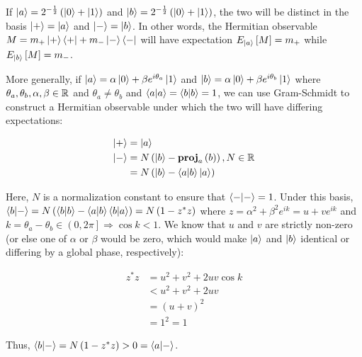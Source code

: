 \documentclass[all.tex]{subfiles}
\begin{document}
\ignorespaces
\parindent 0pt

\par If $\ket{a} = 2^{-\frac{1}{2}} \left( \ket{0} + \ket{1} \right)$ and
$\ket{b} = 2^{-\frac{1}{2}} \left( \ket{0} + \ket{1} \right)$, the two will be
distinct in the basis $\ket{+} = \ket{a}$ and $\ket{-} = \ket{b}$. In other
words, the Hermitian observable $M = m_{+} \ket{+} \bra{+} + m_{-} \ket{-}
\bra{-}$ will have expectation $E_{\ket{a}} \left[ M \right] = m_{+}$ while
$E_{\ket{b}} \left[ M \right] = m_{-}$.

\par More generally, if $\ket{a} = \alpha \ket{0} + \beta e^{i \theta_a}
\ket{1}$ and $\ket{b} = \alpha \ket{0} + \beta e^{i \theta_b} \ket{1}$ where
$\theta_a, \theta_b, \alpha, \beta \in \mathbb{R}$ and $\theta_a \ne \theta_b$ and
$\braket{a|a} = \braket{b|b} = 1$, we can use Gram-Schmidt to construct a
Hermitian observable under which the two will have differing expectations:

\begin{align}
\ket{+} &= \ket{a} \\
\ket{-} &= N \left( \ket{b} - \mathbf{proj}_a \left( b \right) \right), N \in
\mathbb{R} \\
&= N \left( \ket{b} - \braket{a|b} \ket{a} \right)
\end{align}

Here, $N$ is a normalization constant to ensure that $\braket{-|-} = 1$. Under
this basis, $\braket{b|-} = N \left( \braket{b|b} - \braket{a|b} \braket{b|a}
\right) = N \left( 1 - z^* z \right)$ where $z = \alpha^2 + \beta^2 e^{i k} = u
+ v e^{i k}$ and $k = \theta_a - \theta_b \in \left( 0, 2 \pi \right]
\Rightarrow \cos k < 1$. We know that $u$ and $v$ are strictly non-zero (or else
one of $\alpha$ or $\beta$ would be zero, which would make $\ket{a}$ and
$\ket{b}$ identical or differing by a global phase, respectively):

\begin{align}
z^* z &= u^2 + v^2 + 2 u v \cos k \\
&< u^2 + v^2 + 2 u v \\
&= \left( u + v \right)^2 \\
&= 1^2 = 1
\end{align}

Thus, $\braket{b|-} = N \left( 1 - z^* z \right) > 0 = \braket{a|-}$.
\end{document}
